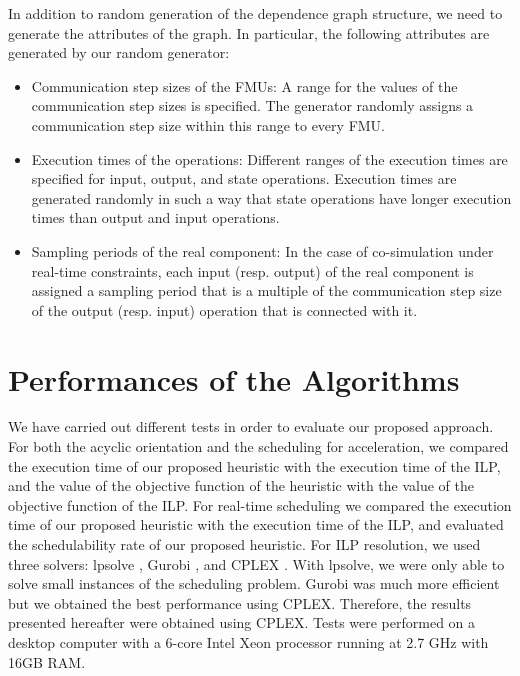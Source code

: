 In addition to random generation of the dependence graph structure, we need to generate the attributes of the graph. In particular, the following attributes are generated by our random generator:
\begin{itemize}
\item Communication step sizes of the FMUs: A range for the values of the communication step sizes is specified. The generator randomly assigns a communication step size within this range to every FMU. 
\item Execution times of the operations: Different ranges of the execution times are specified for input, output, and state operations. Execution times are generated randomly in such a way that state operations have longer execution times than output and input operations.
\item Sampling periods of the real component: In the case of co-simulation under real-time constraints, each input (resp. output) of the real component is assigned a sampling period that is a multiple of the communication step size of the output (resp. input) operation that is connected with it.
\end{itemize}

\section{Performances of the Algorithms}

We have carried out different tests in order to evaluate our proposed approach. For both the acyclic orientation and the scheduling for acceleration, we compared the execution time of our proposed heuristic with the execution time of the ILP, and the value of the objective function of the heuristic with the value of the objective function of the ILP. For real-time scheduling we compared the execution time of our proposed heuristic with the execution time of the ILP, and evaluated the schedulability rate of our proposed heuristic. For ILP resolution, we used three solvers: lpsolve \cite{berkelaar:2004}, Gurobi \cite{gurobi:2016}, and CPLEX \cite{cplex:2017}. With lpsolve, we were only able to solve small instances of the scheduling problem. Gurobi was much more efficient but we obtained the best performance using CPLEX. Therefore, the results presented hereafter were obtained using CPLEX. %
Tests were performed on a desktop computer with a 6-core Intel Xeon processor running at 2.7 GHz with 16GB RAM.

